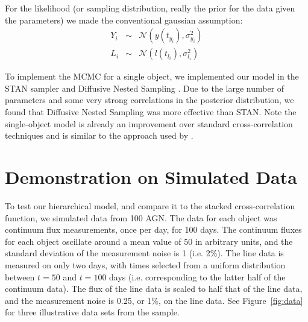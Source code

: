 \documentclass[useAMS,usenatbib]{mn2e}
\begin{document}
For the likelihood (or sampling distribution, really the prior for the data
given the parameters) we made the conventional gaussian assumption:
\begin{eqnarray}
Y_i &\sim& \mathcal{N}\left(y(t_{y_i}), \sigma_{y_i}^2\right)\\
L_i &\sim& \mathcal{N}\left(l(t_{l_i}), \sigma_{l_i}^2\right)
\end{eqnarray}

To implement the MCMC for a single object,
we implemented our model in the STAN sampler \citep{nuts}
and Diffusive Nested Sampling \citep{dnest}. Due to the large number of
parameters and some very strong correlations in the posterior distribution,
we found that Diffusive Nested Sampling was more effective than STAN.
Note the single-object model is already an improvement over standard
cross-correlation techniques and is similar to the approach used by
\citep{2011ApJ...735...80Z}.

\section{Demonstration on Simulated Data}
To test our hierarchical model, and compare it to the stacked cross-correlation
function, we simulated data from 100 AGN. The data for each object was
continuum flux measurements, once per day, for 100 days. The continuum fluxes
for each object oscillate around a mean value of 50 in arbitrary units, and the
standard deviation of the measurement noise is 1 (i.e. 2\%). The line data is measured on
only two days, with times selected from a uniform distribution between $t=50$
and $t=100$ days (i.e. corresponding to the latter half of the continuum data).
The flux of the line data is scaled to half that of the line data, and the
measurement noise is 0.25, or 1\%, on the line data. See Figure~\ref{fig:data}
for three illustrative data sets from the sample.
\end{document}
